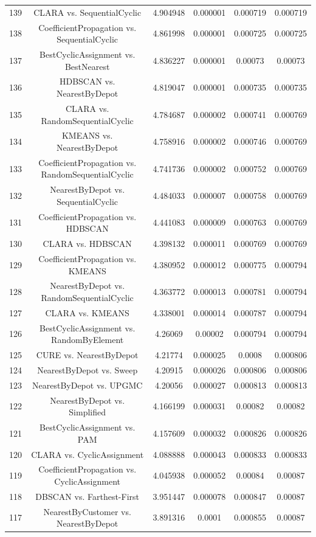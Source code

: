 \documentclass[a4paper,10pt]{article}
\begin{document}
\begin{landscape}
\begin{table}[!htp]
\begin{tabular}{cccccc}
139&CLARA vs. SequentialCyclic&4.904948&0.000001&0.000719&0.000719\\
138&CoefficientPropagation vs. SequentialCyclic&4.861998&0.000001&0.000725&0.000725\\
137&BestCyclicAssignment vs. BestNearest&4.836227&0.000001&0.00073&0.00073\\
136&HDBSCAN vs. NearestByDepot&4.819047&0.000001&0.000735&0.000735\\
135&CLARA vs. RandomSequentialCyclic&4.784687&0.000002&0.000741&0.000769\\
134&KMEANS vs. NearestByDepot&4.758916&0.000002&0.000746&0.000769\\
133&CoefficientPropagation vs. RandomSequentialCyclic&4.741736&0.000002&0.000752&0.000769\\
132&NearestByDepot vs. SequentialCyclic&4.484033&0.000007&0.000758&0.000769\\
131&CoefficientPropagation vs. HDBSCAN&4.441083&0.000009&0.000763&0.000769\\
130&CLARA vs. HDBSCAN&4.398132&0.000011&0.000769&0.000769\\
129&CoefficientPropagation vs. KMEANS&4.380952&0.000012&0.000775&0.000794\\
128&NearestByDepot vs. RandomSequentialCyclic&4.363772&0.000013&0.000781&0.000794\\
127&CLARA vs. KMEANS&4.338001&0.000014&0.000787&0.000794\\
126&BestCyclicAssignment vs. RandomByElement&4.26069&0.00002&0.000794&0.000794\\
125&CURE vs. NearestByDepot&4.21774&0.000025&0.0008&0.000806\\
124&NearestByDepot vs. Sweep&4.20915&0.000026&0.000806&0.000806\\
123&NearestByDepot vs. UPGMC&4.20056&0.000027&0.000813&0.000813\\
122&NearestByDepot vs. Simplified&4.166199&0.000031&0.00082&0.00082\\
121&BestCyclicAssignment vs. PAM&4.157609&0.000032&0.000826&0.000826\\
120&CLARA vs. CyclicAssignment&4.088888&0.000043&0.000833&0.000833\\
119&CoefficientPropagation vs. CyclicAssignment&4.045938&0.000052&0.00084&0.00087\\
118&DBSCAN vs. Farthest-First&3.951447&0.000078&0.000847&0.00087\\
117&NearestByCustomer vs. NearestByDepot&3.891316&0.0001&0.000855&0.00087\\

\end{tabular}
\end{table}
\end{landscape}
\end{document}
